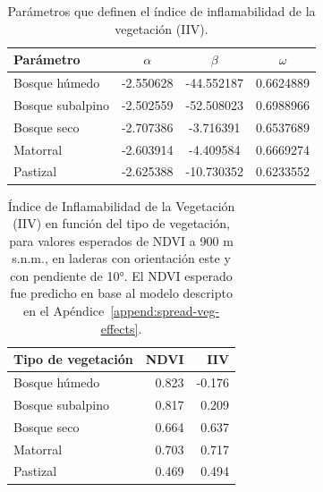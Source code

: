 \begin{table}[h]
    \centering
    \caption[Parámetros que definen el índice de inflamabilidad de la  vegetación.]{Parámetros que definen el índice de inflamabilidad de la  vegetación (IIV).}
    \label{tab:fi_params_veg}
    \begin{tabular}{l|c|c|c}
    \toprule
    Parámetro        & $\alpha$  & $\beta$    & $\omega$  \\
    \midrule
    Bosque húmedo    & -2.550628 & -44.552187 & 0.6624889 \\
    Bosque subalpino & -2.502559 & -52.508023 & 0.6988966 \\
    Bosque seco      & -2.707386 &  -3.716391 & 0.6537689 \\
    Matorral         & -2.603914 &  -4.409584 & 0.6669274 \\
    Pastizal         & -2.625388 & -10.730352 & 0.6233552 \\
    \bottomrule
    \end{tabular}
\end{table}

\begin{table}[h]
    \centering
    \caption[Índice de Inflamabilidad de la Vegetación en función del tipo de vegetación.]{Índice de Inflamabilidad de la Vegetación (IIV) en función del tipo de vegetación, para valores esperados de NDVI a 900 m s.n.m., en laderas con orientación este y con pendiente de 10°. El NDVI esperado fue predicho en base al modelo descripto en el Apéndice~\ref{append:spread-veg-effects}.}
    \label{tab:IIV-values}
    \begin{tabular}{l|rr}
    \toprule
    Tipo de vegetación & NDVI & IIV \\
    \hline
    Bosque húmedo & 0.823 & -0.176 \\
    Bosque subalpino & 0.817 & 0.209 \\
    Bosque seco & 0.664 & 0.637 \\
    Matorral & 0.703 & 0.717 \\
    Pastizal & 0.469 & 0.494 \\
    \bottomrule
    \end{tabular}
\end{table}

